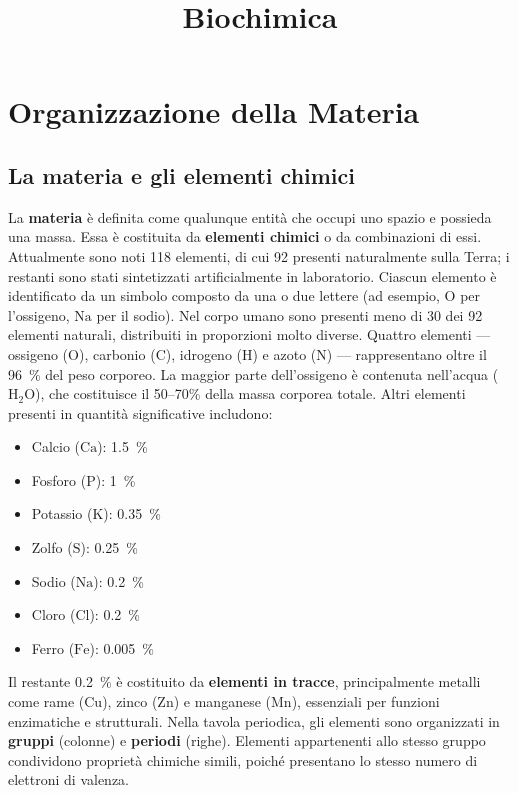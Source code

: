 \documentclass[12pt,a4paper]{report}
\begin{document}
\title{\textbf{Biochimica}}
\author{}
\date{}
\maketitle
{}
\tableofcontents
\clearpage

\chapter{Organizzazione della Materia}
\section{La materia e gli elementi chimici}
La \textbf{materia} è definita come qualunque entità che occupi uno spazio e possieda una massa. Essa è costituita da \textbf{elementi chimici} o da combinazioni di essi. Attualmente sono noti 118 elementi, di cui 92 presenti naturalmente sulla Terra; i restanti sono stati sintetizzati artificialmente in laboratorio. Ciascun elemento è identificato da un simbolo composto da una o due lettere (ad esempio, \(\mathrm{O}\) per l'ossigeno, \(\mathrm{Na}\) per il sodio).
Nel corpo umano sono presenti meno di 30 dei 92 elementi naturali, distribuiti in proporzioni molto diverse. Quattro elementi --- ossigeno (\(\mathrm{O}\)), carbonio (\(\mathrm{C}\)), idrogeno (\(\mathrm{H}\)) e azoto (\(\mathrm{N}\)) --- rappresentano oltre il \SI{96}{\percent} del peso corporeo. La maggior parte dell'ossigeno è contenuta nell'acqua (\(\mathrm{H_2O}\)), che costituisce il 50--70\% della massa corporea totale.
Altri elementi presenti in quantità significative includono:
\begin{itemize}
\item Calcio (\(\mathrm{Ca}\)): \SI{1,5}{\percent}
\item Fosforo (\(\mathrm{P}\)): \SI{1}{\percent}
\item Potassio (\(\mathrm{K}\)): \SI{0,35}{\percent}
\item Zolfo (\(\mathrm{S}\)): \SI{0,25}{\percent}
\item Sodio (\(\mathrm{Na}\)): \SI{0,2}{\percent}
\item Cloro (\(\mathrm{Cl}\)): \SI{0,2}{\percent}
\item Ferro (\(\mathrm{Fe}\)): \SI{0,005}{\percent}
\end{itemize}
Il restante \SI{0,2}{\percent} è costituito da \textbf{elementi in tracce}, principalmente metalli come rame (\(\mathrm{Cu}\)), zinco (\(\mathrm{Zn}\)) e manganese (\(\mathrm{Mn}\)), essenziali per funzioni enzimatiche e strutturali.
Nella tavola periodica, gli elementi sono organizzati in \textbf{gruppi} (colonne) e \textbf{periodi} (righe). Elementi appartenenti allo stesso gruppo condividono proprietà chimiche simili, poiché presentano lo stesso numero di elettroni di valenza.
\end{document}
